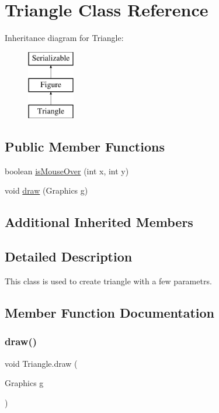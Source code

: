 \hypertarget{class_triangle}{}\section{Triangle Class Reference}
\label{class_triangle}
Inheritance diagram for Triangle\+:\begin{figure}[H]
\begin{center}
\leavevmode
\includegraphics[height=3.000000cm]{class_triangle}
\end{center}
\end{figure}
\subsection*{Public Member Functions}
\begin{DoxyCompactItemize}
\item 
boolean \mbox{\hyperlink{class_triangle_af43f66b724b415c4a3a94567de67e9c6}{is\+Mouse\+Over}} (int x, int y)
\item 
void \mbox{\hyperlink{class_triangle_a66f33cc53576b642a0b3a6893b3141d4}{draw}} (Graphics g)
\end{DoxyCompactItemize}
\subsection*{Additional Inherited Members}


\subsection{Detailed Description}
This class is used to create triangle with a few parametrs. 

\subsection{Member Function Documentation}
\mbox{\label{class_triangle_a66f33cc53576b642a0b3a6893b3141d4}} 
\subsubsection{\texorpdfstring{draw()}{draw()}}
{\footnotesize\ttfamily void Triangle.\+draw (\begin{DoxyParamCaption}\item[{Graphics}]{g }\end{DoxyParamCaption})}

